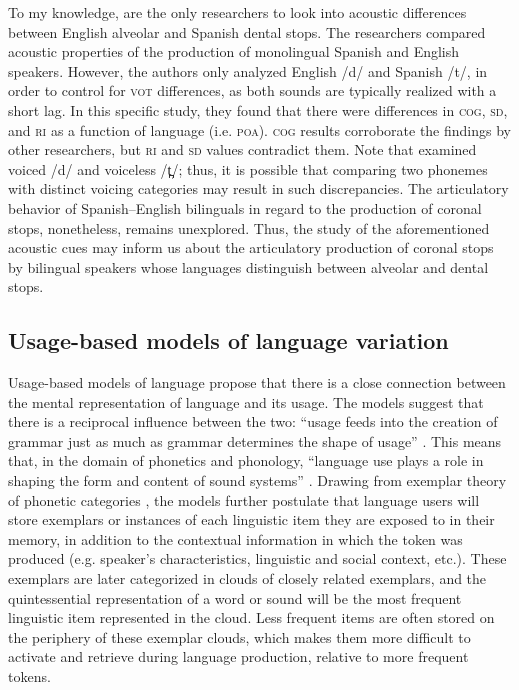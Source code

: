 \documentclass[output=paper,colorlinks,citecolor=brown,
]{langscibook}
\begin{document}
To my knowledge, \citet*{casillas2015acoustics} are the only researchers to look into acoustic differences between English alveolar and Spanish dental stops. The researchers compared acoustic properties of the production of monolingual Spanish and English speakers. However, the authors only analyzed English /d/ and Spanish /t/, in order to control for \textsc{vot} differences, as both sounds are typically realized with a short lag. In this specific study, they found that there were differences in \textsc{cog}, \textsc{sd}, and \textsc{ri} as a function of language (i.e. \textsc{poa}). \textsc{cog} results corroborate the findings by other researchers, but \textsc{ri} and \textsc{sd} values contradict them. Note that \citeauthor{casillas2015acoustics} examined voiced /d/ and voiceless /t̪/; thus, it is possible that comparing two phonemes with distinct voicing categories may result in such discrepancies. The articulatory behavior of Spanish--English bilinguals in regard to the production of coronal stops, nonetheless, remains unexplored. Thus, the study of the aforementioned acoustic cues may inform us about the articulatory production of coronal stops by bilingual speakers whose languages distinguish between alveolar and dental stops.

\subsection{Usage-based models of language variation}

Usage-based models of language \citep[e.g.][]{bybee2001phonology,pierrehumbert2001exemplar} propose that there is a close connection between the mental representation of language and its usage. The models suggest that there is a reciprocal influence between the two: ``usage feeds into the creation of grammar just as much as grammar determines the shape of usage'' \citep[730]{bybee2006usage}. This means that, in the domain of phonetics and phonology, ``language use plays a role in shaping the form and content of sound systems'' \citep[1]{bybee2001phonology}. Drawing from exemplar theory of phonetic categories \citep{johnson1997speech}, the models further postulate that language users will store exemplars or instances of each linguistic item they are exposed to in their memory, in addition to the contextual information in which the token was produced (e.g. speaker's characteristics, linguistic and social context, etc.). These exemplars are later categorized in clouds of closely related exemplars, and the quintessential representation of a word or sound will be the most frequent linguistic item represented in the cloud. Less frequent items are often stored on the periphery of these exemplar clouds, which makes them more difficult to activate and retrieve during language production, relative to more frequent tokens.
\end{document}
